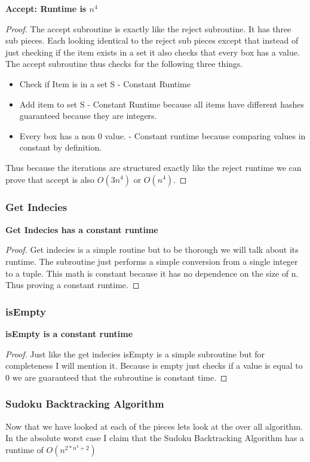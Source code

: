 \documentclass{sig-alternate}
\begin{document}
\textbf{Accept: Runtime is $n^4$}
\begin{proof}
The accept subroutine is exactly like the reject subroutine. It has three sub pieces. Each looking identical to the reject sub pieces except that instead of just checking if the item exists in a set it also checks that every box has a value. The accept subroutine thus checks for the following three things. 

\begin{itemize}
\item{Check if Item is in a set S - Constant Runtime}
\item{Add item to set S - Constant Runtime because all items have different hashes guaranteed because they are integers.}
\item{Every box has a non 0 value. - Constant runtime because comparing values in constant by definition.}
\end{itemize}

Thus because the iterations are structured exactly like the reject runtime we can prove that accept is also $O(3n^4)$ or $O(n^4)$.
\end{proof}

\subsubsection{Get Indecies}
\textbf{Get Indecies has a constant runtime}
\begin{proof}
Get indecies is a simple routine but to be thorough we will talk about its runtime. The subroutine just performs a simple conversion from a single integer to a tuple. This math is constant because it has no dependence on the size of n. Thus proving a constant runtime. 
\end{proof}

\subsubsection{isEmpty}
\textbf{isEmpty is a constant runtime}
\begin{proof}
Just like the get indecies isEmpty is a simple subroutine but for completeness I will mention it. Because is empty just checks if a value is equal to 0 we are guaranteed that the subroutine is constant time. 
\end{proof}

\subsubsection{Sudoku Backtracking Algorithm}
Now that we have looked at each of the pieces lets look at the over all algorithm. In the absolute worst case I claim that the Sudoku Backtracking Algorithm has a runtime of $O(n^{2*n^4 + 2})$
\end{document}
